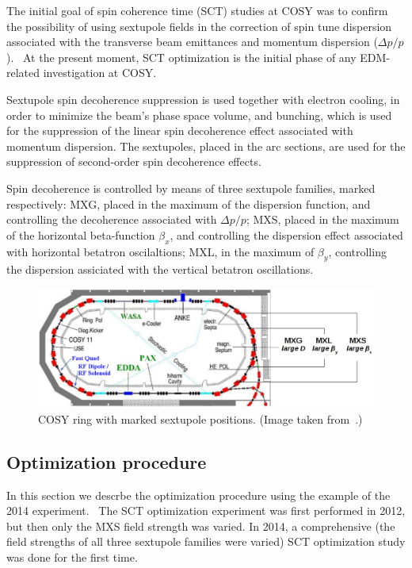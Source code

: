 \newcommand{\dpop}{\Delta p/p}

The initial goal of spin coherence time (SCT) studies at COSY was to 
confirm the possibility of using sextupole fields in the correction of spin tune 
dispersion associated with the transverse beam emittances and 
momentum dispersion ($\dpop$).~\cite{COSY:SCT:IPAC15}
At the present moment, SCT optimization is the initial phase of any EDM-related 
investigation at COSY.

Sextupole spin decoherence suppression is used together with electron cooling, in order to minimize 
the beam's phase space volume, and bunching, which is used for the suppression of the linear spin
decoherence effect associated with momentum dispersion.
The sextupoles, placed in the arc sections, are used for the suppression of
second-order spin decoherence effects.

Spin decoherence is controlled by means of three sextupole families, marked respectively: MXG, 
placed in the maximum of the dispersion function, and controlling the decoherence associated with $\dpop$;
MXS, placed in the maximum of the horizontal beta-function $\beta_x$, and controlling the dispersion effect
associated with horizontal betatron oscilaltions; MXL, in the maximum of $\beta_y$, controlling the dispersion
assiciated with the vertical betatron oscillations.

\begin{figure}[h]\centering
	\includegraphics[width=\linewidth]{images/chapter4/COSY-sextupoles}
	\caption{COSY ring with marked sextupole positions. (Image taken from~\cite{Guidoboni:STORI14}.)}
\end{figure}

\subsection{Optimization procedure}
In this section we descrbe the optimization procedure using the example of the 2014 experiment.~\cite{Guidoboni:STORI14}
The SCT optimization experiment was first performed in 2012, but then only the MXS field strength was varied.
In 2014, a comprehensive (the field strengths of all three sextupole families were varied) SCT optimization
study was done for the first time.

